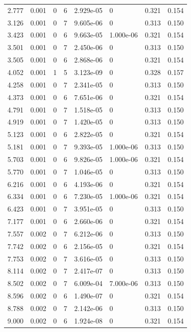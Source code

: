 \documentclass[preview]{standalone}
\begin{document}
{{\begin{tabular}{L{1.2cm}C{1.2cm} C{0.3cm}C{0.5cm} C{1.4cm}C{1.4cm} C{1.4cm}C{1.4cm}}
  2.777  &  0.001  & 0     &  6 &  2.929e-05  & 0  & 0.321 &  0.154   \\ 
  3.126  &  0.001  & 0     &  7 &  9.605e-06  & 0  & 0.313 &  0.150   \\ 
  3.423  &  0.001  & 0     &  6 &  9.663e-05  & 1.000e-06  & 0.321 &  0.154   \\ 
  3.501  &  0.001  & 0     &  7 &  2.450e-06  & 0  & 0.313 &  0.150   \\ 
  3.505  &  0.001  & 0     &  6 &  2.868e-06  & 0  & 0.321 &  0.154   \\ 
  4.052  &  0.001  & 1     &  5 &  3.123e-09  & 0  & 0.328 &  0.157   \\ 
  4.258  &  0.001  & 0     &  7 &  2.341e-05  & 0  & 0.313 &  0.150   \\ 
  4.373  &  0.001  & 0     &  6 &  7.651e-06  & 0  & 0.321 &  0.154   \\ 
  4.791  &  0.001  & 0     &  7 &  1.518e-05  & 0  & 0.313 &  0.150   \\ 
  4.919  &  0.001  & 0     &  7 &  1.420e-05  & 0  & 0.313 &  0.150   \\ 
  5.123  &  0.001  & 0     &  6 &  2.822e-05  & 0  & 0.321 &  0.154   \\ 
  5.181  &  0.001  & 0     &  7 &  9.393e-05  & 1.000e-06  & 0.313 &  0.150   \\ 
  5.703  &  0.001  & 0     &  6 &  9.826e-05  & 1.000e-06  & 0.321 &  0.154   \\ 
  5.770  &  0.001  & 0     &  7 &  1.046e-05  & 0  & 0.313 &  0.150   \\ 
  6.216  &  0.001  & 0     &  6 &  4.193e-06  & 0  & 0.321 &  0.154   \\ 
  6.334  &  0.001  & 0     &  6 &  7.230e-05  & 1.000e-06  & 0.321 &  0.154   \\ 
  6.423  &  0.001  & 0     &  7 &  3.951e-05  & 0  & 0.313 &  0.150   \\ 
  7.177  &  0.001  & 0     &  6 &  2.660e-06  & 0  & 0.321 &  0.154   \\ 
  7.557  &  0.002  & 0     &  7 &  6.212e-06  & 0  & 0.313 &  0.150   \\ 
  7.742  &  0.002  & 0     &  6 &  2.156e-05  & 0  & 0.321 &  0.154   \\ 
  7.753  &  0.002  & 0     &  7 &  3.616e-05  & 0  & 0.313 &  0.150   \\ 
  8.114  &  0.002  & 0     &  7 &  2.417e-07  & 0  & 0.313 &  0.150   \\ 
  8.502  &  0.002  & 0     &  7 &  6.009e-04  & 7.000e-06  & 0.313 &  0.150   \\ 
  8.596  &  0.002  & 0     &  6 &  1.490e-07  & 0  & 0.321 &  0.154   \\ 
  8.788  &  0.002  & 0     &  7 &  2.142e-06  & 0  & 0.313 &  0.150   \\ 
  9.000  &  0.002  & 0     &  6 &  1.924e-08  & 0  & 0.321 &  0.154   \\ 
\hline 
\end{tabular} 

}}
\end{document}
